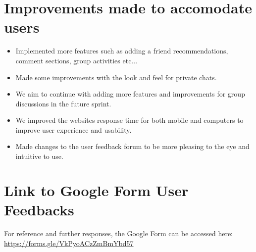 \section{Improvements made to accomodate users}
\begin{itemize}
    \item Implemented more features such as adding a friend recommendations, comment sections, group activities etc...
    \item Made some improvements with the look and feel for private chats.
    \item We aim to continue with adding more features and improvements for group discussions in the future sprint.
    \item We improved the websites response time for both mobile and computers to improve user experience and usability.
    \item Made changes to the user feedback forum to be more pleasing to the eye and intuitive to use.
\end{itemize}

\section{Link to Google Form User Feedbacks}
For reference and further responses, the Google Form can be accessed here: \\
\url{https://forms.gle/VkPyoACzZmBmYbd57}
